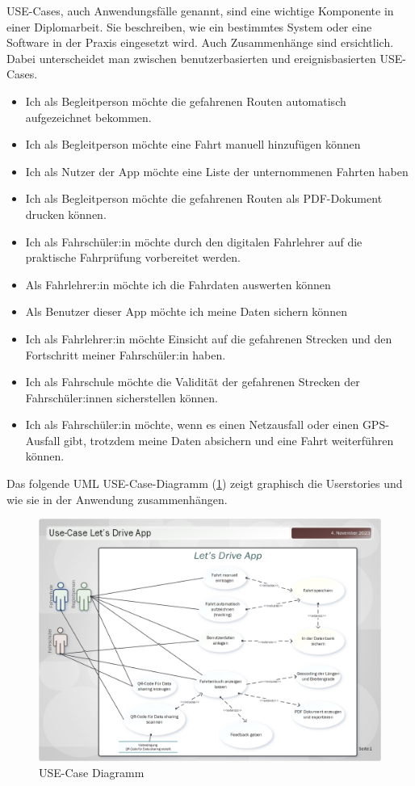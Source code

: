 USE-Cases, auch Anwendungsfälle genannt, sind eine wichtige Komponente in einer Diplomarbeit. Sie beschreiben, wie ein bestimmtes System oder eine Software in der Praxis eingesetzt wird. Auch Zusammenhänge sind ersichtlich. Dabei unterscheidet man zwischen benutzerbasierten und ereignisbasierten USE-Cases.

\begin{itemize}
	\item Ich als Begleitperson möchte die gefahrenen Routen automatisch aufgezeichnet bekommen.
	\item Ich als Begleitperson möchte eine Fahrt manuell hinzufügen können
	\item Ich als Nutzer der App möchte eine Liste der unternommenen Fahrten haben
	\item Ich als Begleitperson möchte die gefahrenen Routen als PDF-Dokument drucken können.
	\item Ich als Fahrschüler:in möchte durch den digitalen Fahrlehrer auf die praktische Fahrprüfung vorbereitet werden.
	\item Als Fahrlehrer:in möchte ich die Fahrdaten auswerten können
	\item Als Benutzer dieser App möchte ich meine Daten sichern können
	\item Ich als Fahrlehrer:in möchte Einsicht auf die gefahrenen Strecken und den Fortschritt meiner Fahrschüler:in haben.
	\item Ich als Fahrschule möchte die Validität der gefahrenen Strecken der Fahrschüler:innen sicherstellen können.
	\item Ich als Fahrschüler:in möchte, wenn es einen Netzausfall oder einen GPS-Ausfall gibt, trotzdem meine Daten absichern und eine Fahrt weiterführen können.
\end{itemize}


Das folgende UML USE-Case-Diagramm (\ref{fig:USE-Case-Diagramm}) zeigt graphisch die Userstories und wie sie in der Anwendung zusammenhängen.

\begin{figure}[H]
	\centering
	\includegraphics[width=15cm]{figures/usecase_diagramm.png}
	\caption{USE-Case Diagramm}
	\label{fig:USE-Case-Diagramm}
\end{figure}

